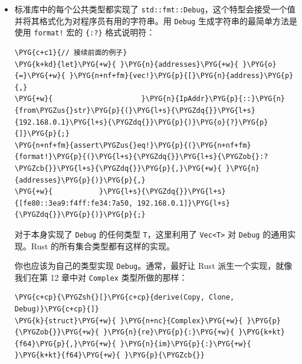 \begin{itemize}
\begin{Verbatim}[commandchars=\\\{\},breaklines=true,breakanywhere=true,fontsize=\codefont,xleftmargin=17bp]
\PYG{c+c1}{// 接续前面的例子}
\PYG{n+nf+fm}{assert\PYGZus{}eq!}\PYG{p}{(}\PYG{n}{address}\PYG{p}{.}\PYG{n}{to\PYGZus{}string}\PYG{p}{(}\PYG{p}{)}\PYG{p}{,}\PYG{+w}{ }\PYG{l+s}{\PYGZdq{}}\PYG{l+s}{fe80::3ea9:f4ff:fe34:7a50}\PYG{l+s}{\PYGZdq{}}\PYG{p}{)}\PYG{p}{;}
\end{Verbatim}

Rust 在引入 \texttt{Display} 之前就已经引入 \texttt{ToString} 特型了，但该特型不太灵活。对于自己的类型，你通常应该实现 \texttt{Display} 而非 \texttt{ToString}。
\item 标准库中的每个公共类型都实现了 \texttt{std::fmt::Debug}，这个特型会接受一个值并将其格式化为对程序员有用的字符串。用 \texttt{Debug} 生成字符串的最简单方法是使用 \texttt{format!} 宏的 \texttt{\{:?\}} 格式说明符：

\begin{Verbatim}[commandchars=\\\{\},breaklines=true,breakanywhere=true,fontsize=\codefont,xleftmargin=17bp]
\PYG{c+c1}{// 接续前面的例子}
\PYG{k+kd}{let}\PYG{+w}{ }\PYG{n}{addresses}\PYG{+w}{ }\PYG{o}{=}\PYG{+w}{ }\PYG{n+nf+fm}{vec!}\PYG{p}{[}\PYG{n}{address}\PYG{p}{,}
\PYG{+w}{                     }\PYG{n}{IpAddr}\PYG{p}{::}\PYG{n}{from\PYGZus{}str}\PYG{p}{(}\PYG{l+s}{\PYGZdq{}}\PYG{l+s}{192.168.0.1}\PYG{l+s}{\PYGZdq{}}\PYG{p}{)}\PYG{o}{?}\PYG{p}{]}\PYG{p}{;}
\PYG{n+nf+fm}{assert\PYGZus{}eq!}\PYG{p}{(}\PYG{n+nf+fm}{format!}\PYG{p}{(}\PYG{l+s}{\PYGZdq{}}\PYG{l+s}{\PYGZob{}:?\PYGZcb{}}\PYG{l+s}{\PYGZdq{}}\PYG{p}{,}\PYG{+w}{ }\PYG{n}{addresses}\PYG{p}{)}\PYG{p}{,}
\PYG{+w}{           }\PYG{l+s}{\PYGZdq{}}\PYG{l+s}{[fe80::3ea9:f4ff:fe34:7a50, 192.168.0.1]}\PYG{l+s}{\PYGZdq{}}\PYG{p}{)}\PYG{p}{;}
\end{Verbatim}

对于本身实现了 \texttt{Debug} 的任何类型 \texttt{T}，这里利用了 \texttt{Vec<T>} 对 \texttt{Debug} 的通用实现。Rust 的所有集合类型都有这样的实现。

你也应该为自己的类型实现 \texttt{Debug}。通常，最好让 Rust 派生一个实现，就像我们在第 12 章中对 \texttt{Complex} 类型所做的那样：

\begin{Verbatim}[commandchars=\\\{\},breaklines=true,breakanywhere=true,fontsize=\codefont,xleftmargin=17bp]
\PYG{c+cp}{\PYGZsh{}[}\PYG{c+cp}{derive(Copy, Clone, Debug)}\PYG{c+cp}{]}
\PYG{k}{struct}\PYG{+w}{ }\PYG{n+nc}{Complex}\PYG{+w}{ }\PYG{p}{\PYGZob{}}\PYG{+w}{ }\PYG{n}{re}\PYG{p}{:}\PYG{+w}{ }\PYG{k+kt}{f64}\PYG{p}{,}\PYG{+w}{ }\PYG{n}{im}\PYG{p}{:}\PYG{+w}{ }\PYG{k+kt}{f64}\PYG{+w}{ }\PYG{p}{\PYGZcb{}}
\end{Verbatim}

\end{itemize}

